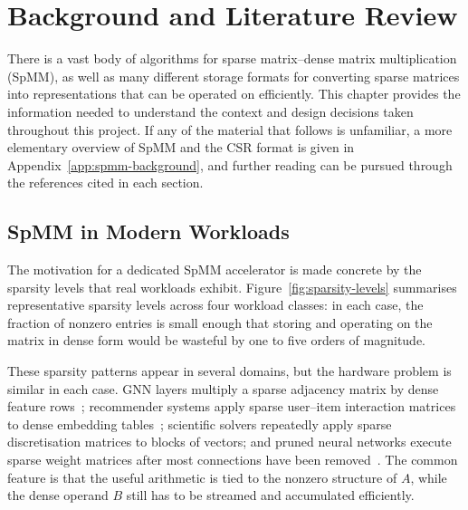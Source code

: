 \chapter{Background and Literature Review}
\label{ch:motivation}

There is a vast body of algorithms for sparse matrix--dense matrix
multiplication (SpMM),
as well as many different storage formats for converting sparse matrices into
representations that can be operated on efficiently. This chapter provides
the information needed to understand the context and design decisions taken
throughout this project.
If any of the material that follows is unfamiliar, a more elementary
overview of SpMM and the CSR format is given in
Appendix~\ref{app:spmm-background}, and further reading can be pursued
through the references cited in each section.
\section{SpMM in Modern Workloads}

The motivation for a dedicated SpMM accelerator is made concrete by the
sparsity levels that real workloads exhibit. Figure~\ref{fig:sparsity-levels}
summarises representative sparsity levels across four workload classes: in
each case, the fraction of nonzero entries is small enough that storing and
operating on the matrix in dense form would be wasteful by one to five
orders of magnitude.



These sparsity patterns appear in several domains, but the hardware problem is
similar in each case. GNN layers multiply a sparse adjacency matrix by dense
feature rows~\citep{graphsage2017, gat2018}; recommender systems apply sparse
user--item interaction matrices to dense embedding tables~\citep{covington2016youtube};
scientific solvers repeatedly apply sparse discretisation matrices to blocks of
vectors; and pruned neural networks execute sparse weight matrices after most
connections have been removed~\citep{han2016eie}. The common feature is that
the useful arithmetic is tied to the nonzero structure of $A$, while the dense
operand $B$ still has to be streamed and accumulated efficiently.

\vspace{1cm}

